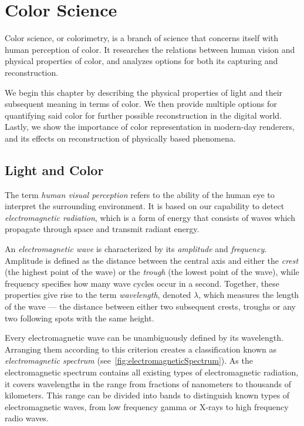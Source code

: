 \chapter{Color Science} \label{chap:colorScience}

Color science, or colorimetry, is a branch of science that concerns itself with human perception of color. It researches the relations between human vision and physical properties of color, and analyzes options for both its capturing and reconstruction.

We begin this chapter by describing the physical properties of light and their subsequent meaning in terms of color. We then provide multiple options for quantifying said color for further possible reconstruction in the digital world. Lastly, we show the importance of color representation in modern-day renderers, and its effects on reconstruction of physically based phenomena.

\section{Light and Color}

The term \emph{human visual perception} refers to the ability of the human eye to interpret the surrounding environment. It is based on our capability to detect \emph{electromagnetic radiation}, which is a form of energy that consists of waves which propagate through space and transmit radiant energy.

An \emph{electromagnetic wave} is characterized by its \emph{amplitude} and \emph{frequency}. Amplitude is defined as the distance between the central axis and either the \emph{crest} (the highest point of the wave) or the \emph{trough} (the lowest point of the wave), while frequency specifies how many wave cycles occur in a second. Together, these properties give rise to the term \emph{wavelength}, denoted $\lambda$, which measures the length of the wave --- the distance between either two subsequent crests, troughs or any two following spots with the same height. 

Every electromagnetic wave can be unambiguously defined by its wavelength. Arranging them according to this criterion creates a classification known as \emph{electromagnetic spectrum} (see~\cref{fig:electromagneticSpectrum}). As the electromagnetic spectrum contains all existing types of electromagnetic radiation, it covers wavelengths in the range from fractions of nanometers to thousands of kilometers. This range can be divided into bands to distinguish known types of electromagnetic waves, from low frequency gamma or X-rays to high frequency radio waves. 

